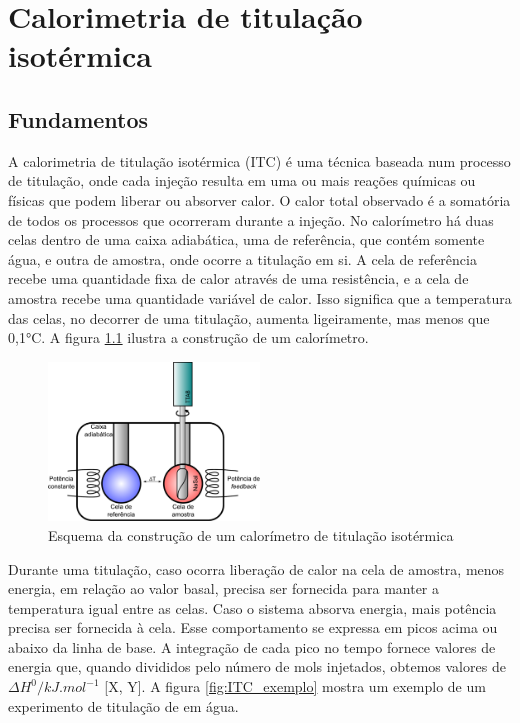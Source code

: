 	\chapter{Calorimetria de titulação isotérmica}
	
		\section{Fundamentos}
		
		
		A calorimetria de titulação isotérmica (ITC) é uma técnica baseada num processo de titulação, onde cada injeção resulta em uma ou mais reações químicas ou físicas que podem liberar ou absorver calor. O calor total observado é a somatória de todos os processos que ocorreram durante a injeção. No calorímetro há duas celas dentro de uma caixa adiabática, uma de referência, que contém somente água, e outra de amostra, onde ocorre a titulação em si. A cela de referência recebe uma quantidade fixa de calor através de uma resistência, e a cela de amostra recebe uma quantidade variável de calor. Isso significa que a temperatura das celas, no decorrer de uma titulação, aumenta ligeiramente, mas menos que 0,1°C. A figura \ref{fig:ITC_esquema} ilustra a construção de um calorímetro.
		
		\begin{figure}[h]
			\centering
			\includegraphics[width=0.5\textwidth]{./imagens/itc/esquema_itc_equipamento}
			\caption{Esquema da construção de um calorímetro de titulação isotérmica}
			\label{fig:ITC_esquema}
		\end{figure}
		
		Durante uma titulação, caso ocorra liberação de calor na cela de amostra, menos energia, em relação ao valor basal, precisa ser fornecida para manter a temperatura igual entre as celas. Caso o sistema absorva energia, mais potência precisa ser fornecida à cela. Esse comportamento se expressa em picos acima ou abaixo da linha de base. A integração de cada pico no tempo fornece valores de energia que, quando divididos pelo número de mols injetados, obtemos valores de $\Delta H^0/kJ.mol^{-1}$ [X, Y]. A figura \ref{fig:ITC_exemplo} mostra um exemplo de um experimento de titulação de \TTAB{} em água.
		
